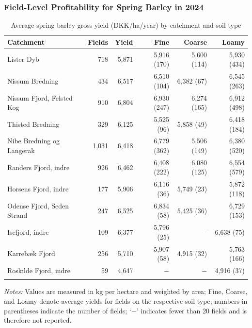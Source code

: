 \documentclass[12pt]{article}
\begin{document}
\subsubsection{Field-Level Profitability for Spring Barley in 2024} 


\begin{table}[H]
\centering
\small
\caption{Average spring barley gross yield (DKK/ha/year) by catchment and soil type}
\label{tab:yield-vaarbyg}
\begin{threeparttable}
\begin{tabular}{lrrrrr}
\toprule
\textbf{Catchment} & \textbf{Fields} & \textbf{Yield} &
\textbf{Fine} & \textbf{Coarse} & \textbf{Loamy} \\
\midrule\addlinespace
Lister Dyb                 & 718  & 5,871 & 5,916 (170) & 5,600 (114) & 5,930 (434) \\
Nissum Bredning            & 434  & 6,517 & 6,510 (104) & 6,382 (67)  & 6,545 (263) \\
Nissum Fjord, Felsted Kog  & 910  & 6,804 & 6,930 (247) & 6,274 (165) & 6,912 (498) \\
Thisted Bredning           & 329  & 6,125 & 5,525 (96)  & 5,858 (49)  & 6,418 (184) \\
Nibe Bredning og Langerak  & 1,031& 6,418 & 6,779 (362) & 5,506 (149) & 6,380 (520) \\
Randers Fjord, indre       & 926  & 6,462 & 6,408 (222) & 6,080 (125) & 6,554 (579) \\
Horsens Fjord, indre       & 177  & 5,906 & 6,116 (36)  & 5,749 (23)  & 5,872 (118) \\
Odense Fjord, Seden Strand & 247  & 6,525 & 6,834 (58)  & 5,425 (36)  & 6,729 (153) \\
Isefjord, indre            & 109  & 6,377 & 5,796 (25)  & $-$          & 6,638 (75) \\
Karrebæk Fjord             & 256  & 5,710 & 5,907 (58)  & 4,915 (32)  & 5,763 (166) \\
Roskilde Fjord, indre      & 59   & 4,647 & $-$          & $-$          & 4,916 (37) \\
\addlinespace\bottomrule
\end{tabular}
\begin{tablenotes}
\footnotesize
\item \textit{Notes:} Values are measured in kg per hectare and weighted by area;
Fine, Coarse, and Loamy denote average yields for fields on the respective soil type;
numbers in parentheses indicate the number of fields; `$-$' indicates fewer than 20 fields and is therefore not reported.
\end{tablenotes}
\end{threeparttable}
\end{table}
\end{document}
